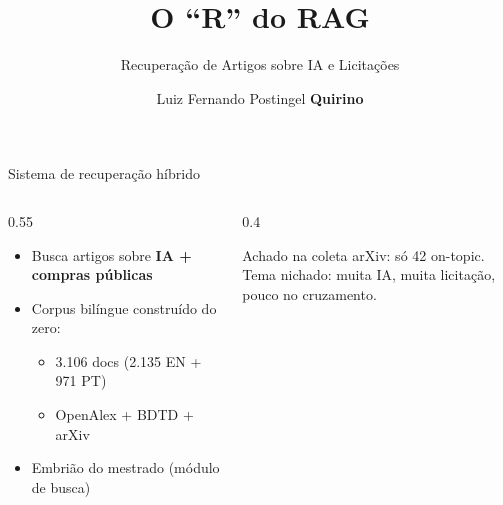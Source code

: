 \documentclass{beamer}
\title{O ``R'' do RAG}
\subtitle{Recuperação de Artigos sobre IA e Licitações}
\author{Luiz Fernando Postingel \textbf{Quirino}}
\begin{document}
\maketitle
\setcounter{framenumber}{0}


\begin{frame}{Sistema de recuperação híbrido}
  \begin{columns}
    \begin{column}{0.55\textwidth}
      \begin{itemize}
        \item Busca artigos sobre \textbf{IA + compras públicas}
        \item Corpus bilíngue construído do zero:
          \begin{itemize}
            \item 3.106 docs (2.135 EN + 971 PT)
            \item OpenAlex + BDTD + arXiv
          \end{itemize}
        \item Embrião do mestrado (módulo de busca)
      \end{itemize}
    \end{column}
    \begin{column}{0.4\textwidth}
      \begin{block}{Achado na coleta}
        arXiv: só 42 on-topic.\\
        Tema \alert{nichado}: muita IA, muita licitação, pouco no cruzamento.
      \end{block}
    \end{column}
  \end{columns}
\end{frame}

\end{document}
